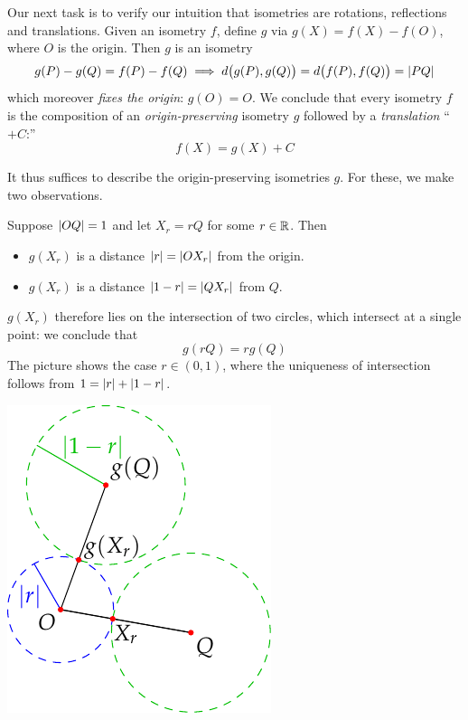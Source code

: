 Our next task is to verify our intuition that isometries are rotations, reflections and translations. Given an isometry $f$, define $g$ via $g(X)=f(X)-f(O)$, where $O$ is the origin. Then $g$ is an isometry
\[g(P)-g(Q)=f(P)-f(Q)\implies d\bigl(g(P),g(Q)\bigr)=d\bigl(f(P),f(Q)\bigr)=\left| PQ\right|\]
which moreover \emph{fixes the origin}: $g(O)=O$. We conclude that every isometry $f$ is the composition of an \emph{origin-preserving} isometry $g$ followed by a \emph{translation} ``$+C$:''
\[f(X)=g(X)+C\]

It thus suffices to describe the origin-preserving isometries $g$. For these, we make two observations.
\begin{enumerate}
\begin{minipage}[t]{0.68\linewidth}\vspace{0pt}
  \item\label{affinity} Suppose $\left| OQ\right|=1$ and let $X_r=rQ$ for some $r\in\mathbb{R}$. Then
  \begin{itemize}
    \item $g(X_r)$ is a distance $\left| r\right|=\left| OX_r\right|$ from the origin.
    \item $g(X_r)$ is a distance $\left| 1-r\right|=\left| QX_r\right|$ from $Q$.
  \end{itemize}
  $g(X_r)$ therefore lies on the intersection of two circles, which intersect at a single point: we conclude that
  \[g(rQ)=rg(Q)\]
  The picture shows the case $r\in(0,1)$, where the uniqueness of intersection follows from
  $1=\left| r\right|+\left| 1-r\right|$.
\end{minipage}\hfill
\begin{minipage}[t]{0.31\linewidth}\vspace{0pt}
\flushright\includegraphics[scale=0.95]{isom-scale}

\end{minipage}
\end{enumerate}

